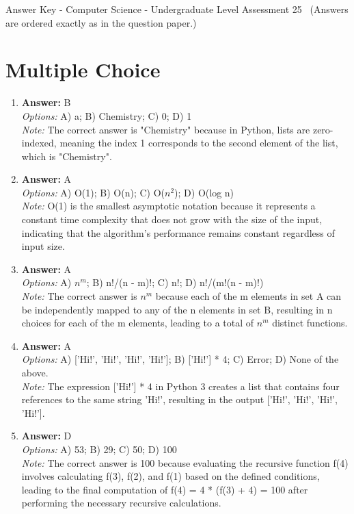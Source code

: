 \documentclass[12pt]{article}
\begin{document}
\begin{center}
Answer Key - Computer Science - Undergraduate Level Assessment 25 \
\small (Answers are ordered exactly as in the question paper.)
\end{center}

\section*{Multiple Choice}
\begin{enumerate}[label=\arabic*.]
\item \textbf{Answer:} B
\\ \textit{Options:} A) a; B) Chemistry; C) 0; D) 1
\\ \textit{Note:} The correct answer is "Chemistry" because in Python, lists are zero-indexed, meaning the index 1 corresponds to the second element of the list, which is "Chemistry".
\item \textbf{Answer:} A
\\ \textit{Options:} A) O(1); B) O(n); C) O($n^2$); D) O(log n)
\\ \textit{Note:} O(1) is the smallest asymptotic notation because it represents a constant time complexity that does not grow with the size of the input, indicating that the algorithm's performance remains constant regardless of input size.
\item \textbf{Answer:} A
\\ \textit{Options:} A) $n^m$; B) n!/(n - m)!; C) n!; D) n!/(m!(n - m)!)
\\ \textit{Note:} The correct answer is $n^m$ because each of the m elements in set A can be independently mapped to any of the n elements in set B, resulting in n choices for each of the m elements, leading to a total of $n^m$ distinct functions.
\item \textbf{Answer:} A
\\ \textit{Options:} A) ['Hi!', 'Hi!', 'Hi!', 'Hi!']; B) ['Hi!'] * 4; C) Error; D) None of the above.
\\ \textit{Note:} The expression ['Hi!'] * 4 in Python 3 creates a list that contains four references to the same string 'Hi!', resulting in the output ['Hi!', 'Hi!', 'Hi!', 'Hi!'].
\item \textbf{Answer:} D
\\ \textit{Options:} A) 53; B) 29; C) 50; D) 100
\\ \textit{Note:} The correct answer is 100 because evaluating the recursive function f(4) involves calculating f(3), f(2), and f(1) based on the defined conditions, leading to the final computation of f(4) = 4 * (f(3) + 4) = 100 after performing the necessary recursive calculations.
\end{enumerate}
\end{document}
